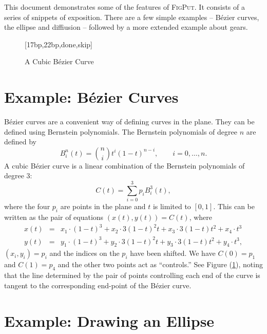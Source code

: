 \documentclass[10pt]{article}
\begin{document}
\VerbatimFootnotes


\SetInnerMargin{135pt}
\SetOuterMargin{135pt}

\NeverSkip



This document demonstrates some of the features of \textsc{FigPut}. It
consists of a series of snippets of exposition. There are a few simple
examples -- B\'ezier curves, the ellipse and diffiusion -- followed by
a more extended example about gears.

\begin{figure}[b!]
[17bp,22bp,done,skip]
\caption{A Cubic B\'ezier Curve}
\label{fig-cubic-bezier}
\end{figure}

\section{Example: B\'ezier Curves}

B\'ezier curves are a convenient way of defining curves in the
plane. They can be defined using Bernstein polynomials. The 
Bernstein polynomials of degree $n$ are defined by
$$B_i^n(t) = {n \choose i} t^i (1-t)^{n-i},\qquad i=0,\ldots,n.$$
A cubic B\'ezier curve is a linear combination of the Bernstein
polynomials of degree 3:
$$C(t) = \sum_{i=0}^3 p_i B_i^3(t),$$
where the four $p_i$ are points in the plane and $t$ is limited to
$[0,1]$. This can be written as the pair of equations $(x(t),y(t))=
C(t)$, where
\begin{eqnarray*}
x(t) &=& x_1\cdot (1-t)^3 + x_2\cdot 3(1-t)^2t + x_3\cdot 3(1-t)t^2 +
x_4\cdot t^3 \\
y(t) &=& y_1\cdot (1-t)^3 + y_2\cdot 3(1-t)^2t + y_3\cdot 3(1-t)t^2 +
y_4\cdot t^3,
\end{eqnarray*}
$(x_i,y_i) = p_i$ and the indices on the $p_i$ have been
shifted. We have $C(0) = p_1$ and $C(1)=p_4$ and the other two points
act as ``controls.'' See Figure (\ref{fig-cubic-bezier}), noting that
the line determined by the pair of points controlling each end of the curve is
tangent to the corresponding end-point of the B\'ezier curve.

\section{Example: Drawing an Ellipse}
\end{document}
